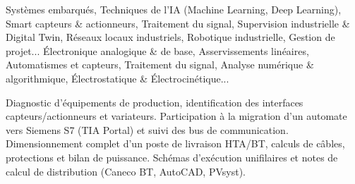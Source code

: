 \documentclass[10pt,a4paper]{../altacv}
\begin{document}
\cvidentite
{}
\makecvheader

\cvformation
{Systèmes embarqués, Techniques de l’IA (Machine Learning, Deep Learning), Smart capteurs \& actionneurs, Traitement du signal, Supervision industrielle \& Digital Twin, Réseaux locaux industriels, Robotique industrielle, Gestion de projet...}
{Électronique analogique \& de base, Asservissements linéaires, Automatismes et capteurs, Traitement du signal, Analyse numérique \& algorithmique, Électrostatique \& Électrocinétique...}

\expmenara
{Diagnostic d’équipements de production, identification des interfaces capteurs/actionneurs et variateurs.}
{Participation à la migration d’un automate vers Siemens S7 (TIA Portal) et suivi des bus de communication.}
\vspace{2pt}
\expcore
{Dimensionnement complet d’un poste de livraison HTA/BT, calculs de câbles, protections et bilan de puissance.}
{Schémas d’exécution unifilaires et notes de calcul de distribution (Caneco BT, AutoCAD, PVsyst).}
\end{document}
